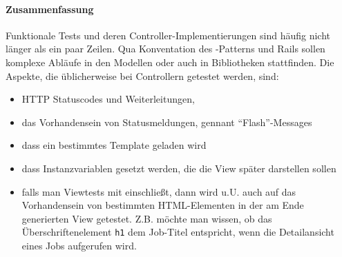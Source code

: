 %
%
%
\begin{ruby}[label=app/controllers/application\_controller.rb]
   
    \PY{o}{[}\PY{o}{]}
\end{ruby}


\begin{ruby}[label=app/controllers/jobs\_controller.rb ]

 
    \PY{o}{[}\PY{o}{]}
    
        
\end{ruby}



\paragraph{Zusammenfassung}
Funktionale Tests und deren Controller-Implementierungen sind häufig nicht länger als ein paar Zeilen. Qua Konventation des -Patterns und Rails sollen komplexe Abläufe in den Modellen oder auch in Bibliotheken stattfinden.
Die Aspekte, die üblicherweise bei Controllern getestet werden, sind:
\begin{itemize}
 \item HTTP Statuscodes und Weiterleitungen,
 \item das Vorhandensein von Statusmeldungen, gennant "`Flash"'-Messages
 \item dass ein bestimmtes Template geladen wird
 \item dass Instanzvariablen gesetzt werden, die die View später darstellen sollen
 \item falls man Viewtests mit einschließt, dann wird u.U. auch auf das Vorhandensein von bestimmten HTML-Elementen in der am Ende generierten View getestet. Z.B. möchte man wissen, ob das Überschriftenelement \texttt{h1} dem Job-Titel entspricht, wenn die Detailansicht eines Jobs aufgerufen wird.
\end{itemize}

